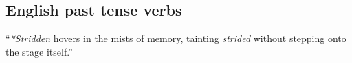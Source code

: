 \subsection{English past tense verbs}

``\emph{*Stridden} hovers in the mists of memory, tainting \emph{strided} without stepping onto the stage itself.'' \citep[][125]{Pinker1999}
